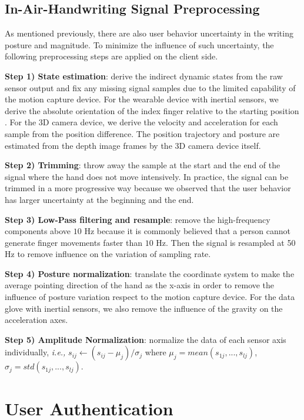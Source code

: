 \documentclass[conference]{IEEEtran}
\begin{document}
\subsection{In-Air-Handwriting Signal Preprocessing}

As mentioned previously, there are also user behavior uncertainty in the writing posture and magnitude. To minimize the influence of such uncertainty, the following preprocessing steps are applied on the client side.

\textbf{Step 1) State estimation}: derive the indirect dynamic states from the raw sensor output and fix any missing signal samples due to the limited capability of the motion capture device. For the wearable device with inertial sensors, we derive the absolute orientation of the index finger relative to the starting position \cite{AHRS}. For the 3D camera device, we derive the velocity and acceleration for each sample from the position difference. The position trajectory and posture are estimated from the depth image frames by the 3D camera device itself.

\textbf{Step 2) Trimming}: throw away the sample at the start and the end of the signal where the hand does not move intensively. In practice, the signal can be trimmed in a more progressive way because we observed that the user behavior has larger uncertainty at the beginning and the end.

\textbf{Step 3) Low-Pass filtering and resample}: remove the high-frequency components above $10$ Hz because it is commonly believed that a person cannot generate finger movements faster than $10$ Hz. Then the signal is resampled at 50 Hz to remove influence on the variation of sampling rate.

\textbf{Step 4) Posture normalization}: translate the coordinate system to make the average pointing direction of the hand as the x-axis in order to remove the influence of posture variation respect to the motion capture device. For the data glove with inertial sensors, we also remove the influence of the gravity on the acceleration axes.

\textbf{Step 5) Amplitude Normalization}: normalize the data of each sensor axis individually, \textit{i.e.,} $s_{ij} \leftarrow (s_{ij} - \mu_{j}) / \sigma_{j}$
where 
$\mu_{j} = mean(s_{1j}, ..., s_{lj})$,    $\sigma_{j} = std(s_{1j}, ..., s_{lj}).$



\section{User Authentication}
\end{document}
